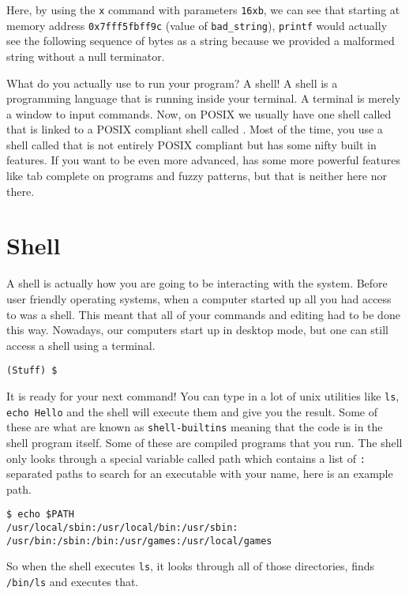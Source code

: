 Here, by using the \texttt{x} command with parameters \texttt{16xb}, we can see that starting at memory address \texttt{0x7fff5fbff9c} (value of \texttt{bad\_string}), \texttt{printf} would actually see the following sequence of bytes as a string because we provided a malformed string without a null terminator.

What do you actually use to run your program? A shell! A shell is a programming language that is running inside your terminal. A terminal is merely a window to input commands. Now, on POSIX we usually have one shell called  that is linked to a POSIX compliant shell called . Most of the time, you use a shell called  that is not entirely POSIX compliant but has some nifty built in features. If you want to be even more advanced,  has some more powerful features like tab complete on programs and fuzzy patterns, but that is neither here nor there. 

\section{Shell}

A shell is actually how you are going to be interacting with the system. Before user friendly operating systems, when a computer started up all you had access to was a shell. This meant that all of your commands and editing had to be done this way. Nowadays, our computers start up in desktop mode, but one can still access a shell using a terminal. 

\begin{verbatim}
(Stuff) $
\end{verbatim}

It is ready for your next command! You can type in a lot of unix utilities like \texttt{ls}, \texttt{echo\ Hello} and the shell will execute them and give you the result. Some of these are what are known as \texttt{shell-builtins} meaning that the code is in the shell program itself. Some of these are compiled programs that you run. The shell only looks through a special variable called path which contains a list of \texttt{:} separated paths to search for an executable with your name, here is an example path.

\begin{verbatim}
$ echo $PATH
/usr/local/sbin:/usr/local/bin:/usr/sbin:
/usr/bin:/sbin:/bin:/usr/games:/usr/local/games
\end{verbatim}

So when the shell executes \texttt{ls}, it looks through all of those directories, finds \texttt{/bin/ls} and executes that.

